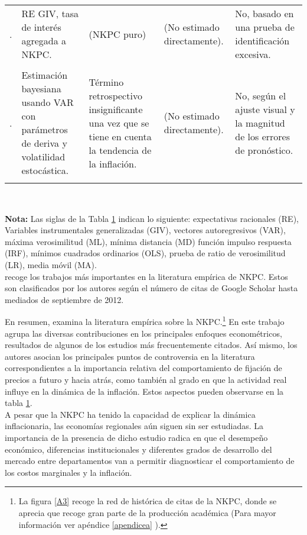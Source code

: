 \begin{table}
{\begin{tabular}{p{3cm} p{3cm} p{5cm} p{5cm} p{5cm}}
    \cite{ravenna2006optimal}.       & RE GIV, tasa de interés agregada a NKPC. & (NKPC puro) & (No estimado directamente). & No, basado en una prueba de identificación excesiva. \\ \\ 
    \cite{cogley2008trend}.       & Estimación bayesiana usando VAR con parámetros de deriva y volatilidad estocástica. & Término retrospectivo insignificante una vez que se tiene en cuenta la tendencia de la inflación. & (No estimado directamente). & No, según el ajuste visual y la magnitud de los errores de pronóstico. \\ \\ 
           \hline
    \end{tabular}%
 }
  \label{e2}\\
  \raggedright  \scriptsize \textbf{Nota:} Las siglas de la Tabla \ref{e2} indican lo siguiente:  expectativas racionales (RE), Variables instrumentales generalizadas (GIV), vectores autoregresivos (VAR), máxima verosimilitud (ML), mínima distancia (MD) función impulso respuesta (IRF), mínimos cuadrados ordinarios (OLS),  prueba de ratio de verosimilitud (LR), media móvil (MA).\\
  \cite{mavroeidis2014empirical} recoge los trabajos más importantes en la  literatura empírica de NKPC. Estos son clasificados por los autores según el número de citas de Google Scholar hasta mediados de septiembre de 2012.
\end{table}%

En resumen, \cite{mavroeidis2014empirical} examina  la literatura empírica sobre la NKPC.\footnote{La figura \ref{A3} recoge la red de histórica de citas de la NKPC, donde se aprecia que \cite{mavroeidis2014empirical} recoge gran parte de la producción académica (Para mayor información ver apéndice \ref{apendicea} ).} En este trabajo agrupa las diversas contribuciones en los principales enfoques econométricos,  resultados de algunos de los estudios más frecuentemente citados. Así mismo, los autores asocian los principales puntos de controversia en la literatura correspondientes a la importancia relativa del comportamiento de fijación de precios a futuro y hacia atrás, como también al grado en que la actividad real influye en la dinámica de la inflación. Estos aspectos pueden observarse en la tabla \ref{e2}.\\

A pesar que la NKPC ha tenido la capacidad de explicar la dinámica inflacionaria, las economías regionales aún siguen sin ser estudiadas. La importancia de la presencia de dicho estudio  radica en que el desempeño económico, diferencias institucionales y diferentes grados de desarrollo del mercado entre departamentos van a permitir diagnosticar el comportamiento de los costos marginales y la inflación.\\

